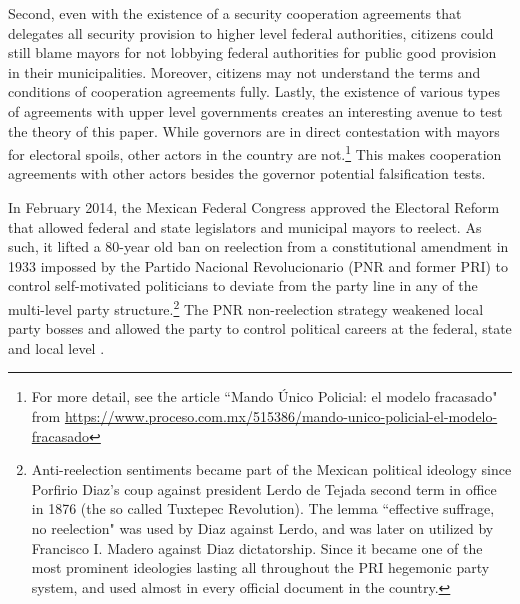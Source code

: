 \documentclass[12pt]{amsart}
\makeatletter
\def\section{\@startsection{section}{1}
	\z@{1.0\linespacing\@plus\linespacing}{.5\linespacing}{\Large}}
\numberwithin{equation}{section}
\theoremstyle{definition}
\theoremstyle{definition}
\theoremstyle{definition}
\makeatother
\begin{document}
Second, even with the existence of a security cooperation agreements that delegates all security provision to higher level federal authorities, citizens could still blame mayors for not lobbying federal authorities for public good provision in their municipalities. Moreover, citizens may not understand the terms and conditions of cooperation agreements fully. Lastly, the existence of various types of agreements with upper level governments creates an interesting avenue to test the theory of this paper. While governors are in direct contestation with mayors for electoral spoils, other actors in the country are not.\footnote{For more detail, see the article ``Mando \'Unico Policial: el modelo fracasado" from \url{https://www.proceso.com.mx/515386/mando-unico-policial-el-modelo-fracasado}} This makes cooperation agreements with other actors besides the governor potential falsification tests.   


\section{Term Limit Reform of 2014 \label{sec:reform}}   
       
In February 2014, the Mexican Federal Congress approved the Electoral Reform that allowed federal and state legislators and municipal mayors to reelect. As such, it lifted a 80-year old ban on reelection from a constitutional amendment in 1933 impossed by the Partido Nacional Revolucionario (PNR and former PRI) to control self-motivated politicians to deviate from the party line in any of the multi-level party structure.\footnote{Anti-reelection sentiments became part of the Mexican political ideology since Porfirio Diaz's coup against president Lerdo de Tejada second term in office in 1876 (the so called Tuxtepec Revolution). The lemma ``effective suffrage, no reelection" was used by Diaz against Lerdo, and was later on utilized by Francisco I. Madero against Diaz dictatorship. Since it became one of the most prominent ideologies lasting all throughout the PRI hegemonic party system, and used almost in every official document in the country.} The PNR non-reelection strategy weakened local party bosses and allowed the party to control political careers at the federal, state and local level \citep{weldon_2003}. 
\end{document}
